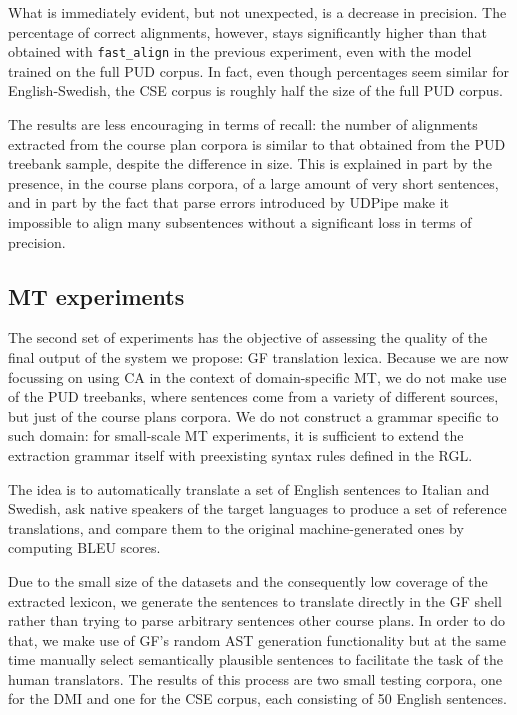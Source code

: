 \documentclass[11pt]{article}
\begin{document}
What is immediately evident, but not unexpected, is a decrease in precision. 
The percentage of correct alignments, however, stays significantly higher than that obtained with \texttt{fast\_align} in the previous experiment, even with the model trained on the full PUD corpus. 
In fact, even though percentages seem similar for English-Swedish, the CSE corpus is roughly half the size of the full PUD corpus.

The results are less encouraging in terms of recall: the number of alignments extracted from the course plan corpora is similar to that obtained from the PUD treebank sample, despite the difference in size. 
This is explained in part by the presence, in the course plans corpora, of a large amount of very short sentences, and in part by the fact that parse errors introduced by UDPipe make it impossible to align many subsentences without a significant loss in terms of precision.  

\subsection{MT experiments} \label{mtexp}
The second set of experiments has the objective of assessing the quality of the final output of the system we propose: GF translation lexica. 
Because we are now focussing on using CA in the context of domain-specific MT, we do not make use of the PUD treebanks, where sentences come from a variety of different sources, but just of the course plans corpora. 
We do not construct a grammar specific to such domain: for small-scale MT experiments, it is sufficient to extend the extraction grammar itself with preexisting syntax rules defined in the RGL. 

The idea is to automatically translate a set of English sentences to Italian and Swedish, ask native speakers of the target languages to produce a set of reference translations, and compare them to the original machine-generated ones by computing BLEU scores.

Due to the small size of the datasets and the consequently low coverage of the extracted lexicon, we generate the sentences to translate directly in the GF shell rather than trying to parse arbitrary sentences other course plans. 
In order to do that, we make use of GF's random AST generation functionality but at the same time manually select semantically plausible sentences to facilitate the task of the human translators.
The results of this process are two small testing corpora, one for the DMI and one for the CSE corpus, each consisting of 50 English sentences. 
\end{document}
